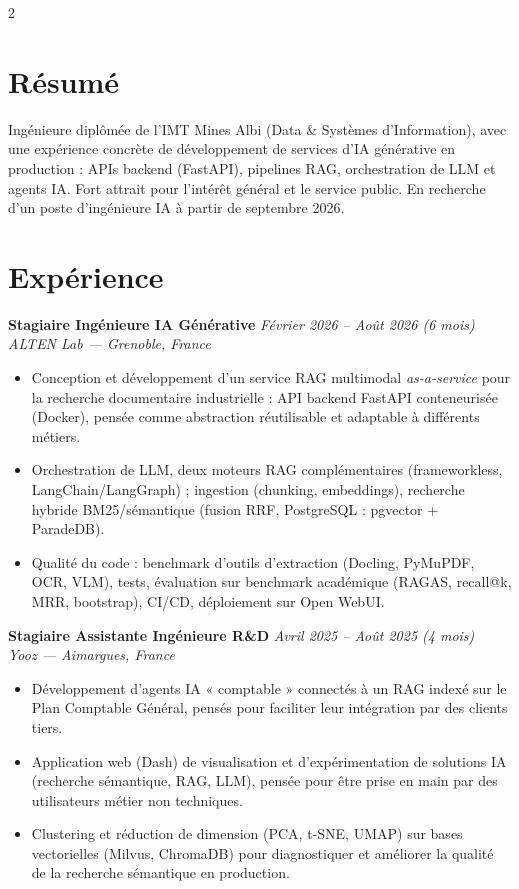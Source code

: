 \documentclass[10.5pt,a4paper]{article}
\newcommand{\sectionrule}{\vspace{-6pt}{\color{accent}\hrule height 1pt}\vspace{3pt}}
\newcommand{\cvexp}[5]{%
  \noindent\textbf{#1} \hfill {\itshape\color{graytext}\small #4}\\
  {\itshape #2 --- #3}\\[-6pt]
  #5
  \vspace{9pt}
}
\begin{document}
\begin{paracol}{2}

\section*{Résumé}
\sectionrule
\justifying
Ingénieure diplômée de l'IMT Mines Albi (Data \& Systèmes d'Information), avec une expérience concrète de développement de services d'IA générative en production : APIs backend (FastAPI), pipelines RAG, orchestration de LLM et agents IA. Fort attrait pour l'intérêt général et le service public. En recherche d'un poste d'ingénieure IA à partir de septembre 2026.

\section*{Expérience}
\sectionrule

\cvexp{Stagiaire Ingénieure IA Générative}{ALTEN Lab}{Grenoble, France}{Février 2026 -- Août 2026 (6 mois)}{%
  \begin{itemize}[leftmargin=12pt, itemsep=2pt, topsep=0pt, partopsep=0pt, parsep=0pt]
    \item Conception et développement d'un service RAG multimodal \emph{as-a-service} pour la recherche documentaire industrielle : API backend FastAPI conteneurisée (Docker), pensée comme abstraction réutilisable et adaptable à différents métiers.
    \item Orchestration de LLM, deux moteurs RAG complémentaires (frameworkless, LangChain/\allowbreak LangGraph) ; ingestion (chunking, embeddings), recherche hybride BM25/\allowbreak sémantique (fusion RRF, PostgreSQL : pgvector + ParadeDB).
    \item Qualité du code : benchmark d'outils d'extraction (Docling, PyMuPDF, OCR, VLM), tests, évaluation sur benchmark académique (RAGAS, recall@k, MRR, bootstrap), CI/CD, déploiement sur Open WebUI.
  \end{itemize}
}

\cvexp{Stagiaire Assistante Ingénieure R\&D}{Yooz}{Aimargues, France}{Avril 2025 -- Août 2025 (4 mois)}{%
  \begin{itemize}[leftmargin=12pt, itemsep=2pt, topsep=0pt, partopsep=0pt, parsep=0pt]
    \item Développement d'agents IA « comptable » connectés à un RAG indexé sur le Plan Comptable Général, pensés pour faciliter leur intégration par des clients tiers.
    \item Application web (Dash) de visualisation et d'expérimentation de solutions IA (recherche sémantique, RAG, LLM), pensée pour être prise en main par des utilisateurs métier non techniques.
    \item Clustering et réduction de dimension (PCA, t-SNE, UMAP) sur bases vectorielles (Milvus, ChromaDB) pour diagnostiquer et améliorer la qualité de la recherche sémantique en production.
  \end{itemize}
}


\end{paracol}
\end{document}
